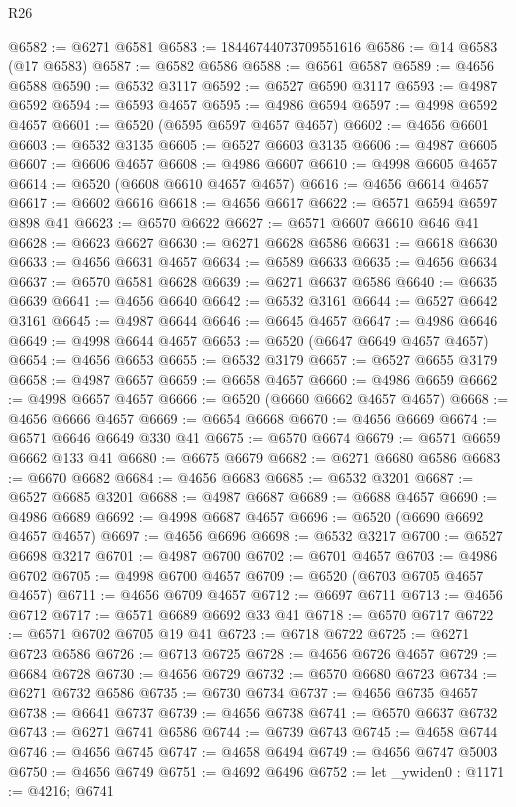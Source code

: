 \begin{lexlean}{R26}
\begin{coremodule}
@6582 := @6271 @6581
@6583 := 18446744073709551616
@6586 := @14 @6583 (@17 @6583)
@6587 := @6582 @6586
@6588 := @6561 @6587
@6589 := @4656 @6588
@6590 := @6532 @3117
@6592 := @6527 @6590 @3117
@6593 := @4987 @6592
@6594 := @6593 @4657
@6595 := @4986 @6594
@6597 := @4998 @6592 @4657
@6601 := @6520 (@6595 @6597 @4657 @4657)
@6602 := @4656 @6601
@6603 := @6532 @3135
@6605 := @6527 @6603 @3135
@6606 := @4987 @6605
@6607 := @6606 @4657
@6608 := @4986 @6607
@6610 := @4998 @6605 @4657
@6614 := @6520 (@6608 @6610 @4657 @4657)
@6616 := @4656 @6614 @4657
@6617 := @6602 @6616
@6618 := @4656 @6617
@6622 := @6571 @6594 @6597 @898 @41
@6623 := @6570 @6622
@6627 := @6571 @6607 @6610 @646 @41
@6628 := @6623 @6627
@6630 := @6271 @6628 @6586
@6631 := @6618 @6630
@6633 := @4656 @6631 @4657
@6634 := @6589 @6633
@6635 := @4656 @6634
@6637 := @6570 @6581 @6628
@6639 := @6271 @6637 @6586
@6640 := @6635 @6639
@6641 := @4656 @6640
@6642 := @6532 @3161
@6644 := @6527 @6642 @3161
@6645 := @4987 @6644
@6646 := @6645 @4657
@6647 := @4986 @6646
@6649 := @4998 @6644 @4657
@6653 := @6520 (@6647 @6649 @4657 @4657)
@6654 := @4656 @6653
@6655 := @6532 @3179
@6657 := @6527 @6655 @3179
@6658 := @4987 @6657
@6659 := @6658 @4657
@6660 := @4986 @6659
@6662 := @4998 @6657 @4657
@6666 := @6520 (@6660 @6662 @4657 @4657)
@6668 := @4656 @6666 @4657
@6669 := @6654 @6668
@6670 := @4656 @6669
@6674 := @6571 @6646 @6649 @330 @41
@6675 := @6570 @6674
@6679 := @6571 @6659 @6662 @133 @41
@6680 := @6675 @6679
@6682 := @6271 @6680 @6586
@6683 := @6670 @6682
@6684 := @4656 @6683
@6685 := @6532 @3201
@6687 := @6527 @6685 @3201
@6688 := @4987 @6687
@6689 := @6688 @4657
@6690 := @4986 @6689
@6692 := @4998 @6687 @4657
@6696 := @6520 (@6690 @6692 @4657 @4657)
@6697 := @4656 @6696
@6698 := @6532 @3217
@6700 := @6527 @6698 @3217
@6701 := @4987 @6700
@6702 := @6701 @4657
@6703 := @4986 @6702
@6705 := @4998 @6700 @4657
@6709 := @6520 (@6703 @6705 @4657 @4657)
@6711 := @4656 @6709 @4657
@6712 := @6697 @6711
@6713 := @4656 @6712
@6717 := @6571 @6689 @6692 @33 @41
@6718 := @6570 @6717
@6722 := @6571 @6702 @6705 @19 @41
@6723 := @6718 @6722
@6725 := @6271 @6723 @6586
@6726 := @6713 @6725
@6728 := @4656 @6726 @4657
@6729 := @6684 @6728
@6730 := @4656 @6729
@6732 := @6570 @6680 @6723
@6734 := @6271 @6732 @6586
@6735 := @6730 @6734
@6737 := @4656 @6735 @4657
@6738 := @6641 @6737
@6739 := @4656 @6738
@6741 := @6570 @6637 @6732
@6743 := @6271 @6741 @6586
@6744 := @6739 @6743
@6745 := @4658 @6744
@6746 := @4656 @6745
@6747 := @4658 @6494
@6749 := @4656 @6747 @5003
@6750 := @4656 @6749
@6751 := @4692 @6496
@6752 := let _ywiden0 : @1171 := @4216; @6741

\end{coremodule}
\end{lexlean}
